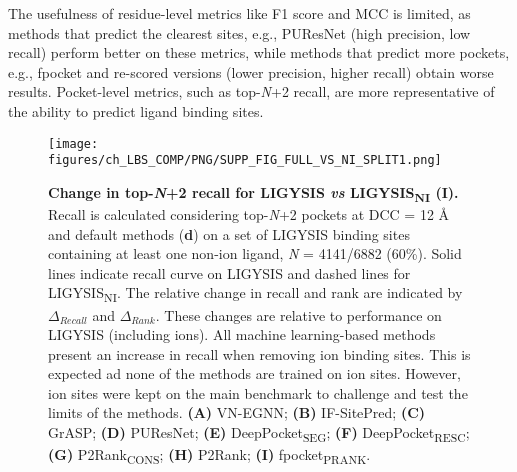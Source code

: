 The usefulness of residue-level metrics like F1 score and MCC is limited, as methods that predict the clearest sites, e.g., PUResNet (high precision, low recall) perform better on these metrics, while methods that predict more pockets, e.g., fpocket and re-scored versions (lower precision, higher recall) obtain worse results. Pocket-level metrics, such as top-\textit{N}+2 recall, are more representative of the ability to predict ligand binding sites.

\begin{figure}[htb!]
    \centering
    \texttt{[image: figures/ch\_LBS\_COMP/PNG/SUPP\_FIG\_FULL\_VS\_NI\_SPLIT1.png]}
    \caption[Change in top-\textit{N}+2 recall for LIGYSIS \textit{vs} LIGYSIS\textsubscript{NI} (I)]{\textbf{Change in top-\textit{N}+2 recall for LIGYSIS \textit{vs} LIGYSIS\textsubscript{NI} (I).} Recall is calculated considering top-\textit{N}+2 pockets at DCC = 12 \AA{} and default methods (\textbf{d}) on a set of LIGYSIS binding sites containing at least one non-ion ligand, \textit{N} = 4141/6882 (60\%). Solid lines indicate recall curve on LIGYSIS and dashed lines for LIGYSIS\textsubscript{NI}. The relative change in recall and rank are indicated by $\Delta_{Recall}$ and $\Delta_{Rank}$. These changes are relative to performance on LIGYSIS (including ions). All machine learning-based methods present an increase in recall when removing ion binding sites. This is expected ad none of the methods are trained on ion sites. However, ion sites were kept on the main benchmark to challenge and test the limits of the methods. \textbf{(A)} VN-EGNN; \textbf{(B)} IF-SitePred; \textbf{(C)} GrASP; \textbf{(D)} PUResNet; \textbf{(E)} DeepPocket\textsubscript{SEG}; \textbf{(F)} DeepPocket\textsubscript{RESC}; \textbf{(G)} P2Rank\textsubscript{CONS}; \textbf{(H)} P2Rank; \textbf{(I)} fpocket\textsubscript{PRANK}.}
    \label{fig:LIGYSIS_VS_LIGYSISNI_1}
\end{figure}

